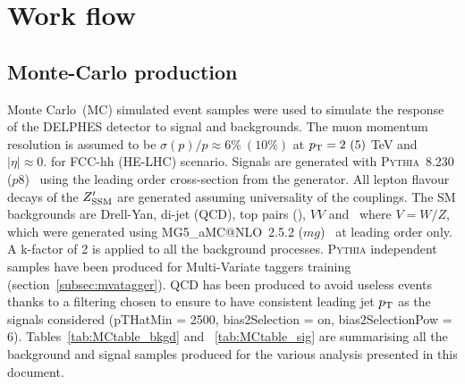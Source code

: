 \section{Work flow}
\label{sec:fccworkflow}

\subsection{Monte-Carlo production}
\label{subsec:mcprod}

Monte Carlo~(MC) simulated event samples were used to simulate the response of the DELPHES detector to signal and backgrounds. The muon momentum resolution is assumed to be $\sigma(p)/p \approx 6\%~(10\%)$ at $p_{\text{T}}= 2~(5)$ TeV and $|\eta| \approx 0.$ for FCC-hh (HE-LHC) scenario. Signals are generated with {\scshape Pythia}~8.230 ($p8$)~\cite{Sjostrand:2014zea} using the leading order cross-section from the generator.
All lepton flavour decays of the $Z^{\prime}_{\mathrm{SSM}}$ are generated assuming universality of the couplings.
The SM backgrounds are Drell-Yan, di-jet (QCD), top pairs (\ttbar), $VV$ and \vj\ where $V=W/Z$, which were generated using {\scshape MG5\_}a{\scshape MC@NLO}~2.5.2 ($mg$)~\cite{Alwall:2014hca} at leading order only. A k-factor of 2 is applied to all the background processes. \newline
{\scshape Pythia} independent samples have been produced for Multi-Variate taggers training (section~\ref{subsec:mvatagger}). QCD has been produced to avoid useless events thanks to a filtering chosen to ensure to have consistent leading jet $p\sb{\scriptstyle\mathrm{T}}$ as the signals considered (pTHatMin = 2500, bias2Selection = on, bias2SelectionPow = 6).\newline
Tables~\ref{tab:MCtable_bkgd} and ~\ref{tab:MCtable_sig} are summarising all the background and signal samples produced for the various analysis presented in this document.

